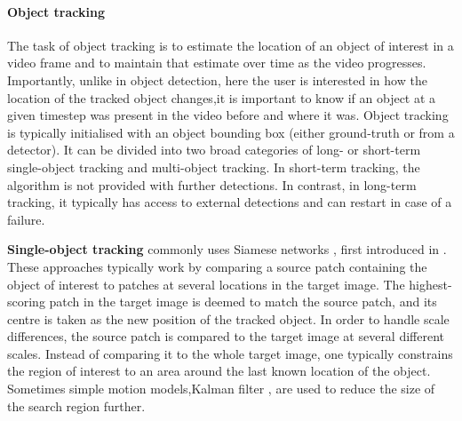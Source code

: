 \paragraph{Object tracking}
The task of object tracking is to estimate the location of an object of interest in a video frame and to maintain that estimate over time as the video progresses.
Importantly, unlike in object detection, here the user is interested in how the location of the tracked object changes,\ie it is important to know if an object at a given timestep was present in the video before and where it was.
Object tracking is typically initialised with an object bounding box (either ground-truth or from a detector). It can be divided into two broad categories of long- or short-term single-object tracking and multi-object tracking.
In short-term tracking, the algorithm is not provided with further detections. In contrast, in long-term tracking, it typically has access to external detections and can restart in case of a failure.

%    
%
\textbf{Single-object tracking} commonly uses Siamese networks \citep{Valmadre2017,Held2016goturn}, first introduced in \cite{Bromley1993siamese,Schmidhuber1993dicovering}.
These approaches typically work by comparing a source patch containing the object of interest to patches at several locations in the target image.
The highest-scoring patch in the target image is deemed to match the source patch, and its centre is taken as the new position of the tracked object.
In order to handle scale differences, the source patch is compared to the target image at several different scales.
Instead of comparing it to the whole target image, one typically constrains the region of interest to an area around the last known location of the object.
Sometimes simple motion models,\eg Kalman filter  \citep{Swerling1959kalman,Kalman1961kalman}, are used to reduce the size of the search region further.

